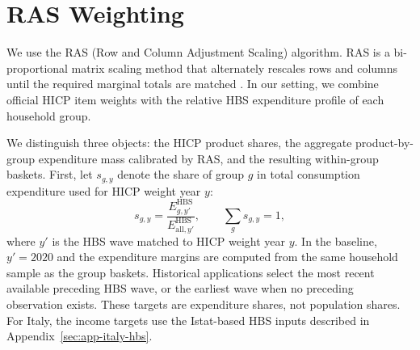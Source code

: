 \documentclass[11pt]{article}
\begin{document}
\clearpage



\clearpage



\clearpage



\clearpage

\section{RAS Weighting}
\label{sec:app-weight-normalization}

We use the RAS (Row and Column Adjustment Scaling) algorithm. RAS is a bi-proportional matrix
scaling method that alternately rescales rows and columns until the required marginal totals are
matched \citep{bacharach1965estimating}. In our setting, we combine official HICP item weights with
the relative HBS expenditure profile of each household group.

We distinguish three objects: the HICP product shares, the aggregate product-by-group expenditure
mass calibrated by RAS, and the resulting within-group baskets. First, let $s_{g,y}$ denote the
share of group $g$ in total consumption expenditure used for HICP weight year $y$:
\begin{equation}
s_{g,y}
=
\frac{E^{\mathrm{HBS}}_{g,y'}}{E^{\mathrm{HBS}}_{\mathrm{all},y'}},
\qquad
\sum_g s_{g,y}=1,
\end{equation}
where $y'$ is the HBS wave matched to HICP weight year $y$. In the baseline, $y'=2020$ and the expenditure margins are computed from the same household sample as the group baskets. Historical applications select the most recent available preceding HBS wave, or the earliest wave when no preceding observation exists. These targets are expenditure shares, not population shares. For Italy, the income targets use the Istat-based HBS
inputs described in Appendix~\ref{sec:app-italy-hbs}.
\end{document}

